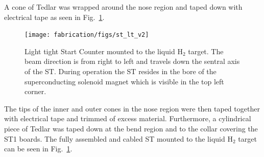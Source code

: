 A cone of Tedlar was wrapped around the nose region and taped down with electrical tape as seen in Fig.~\ref{fig:light_tight_st}. 
\begin{figure}[!htb]
	\centering
	\texttt{[image: fabrication/figs/st\_lt\_v2]}
	\caption{Light tight Start Counter mounted to the \gx{} liquid $\mathrm{H_{2}}$ target.  The beam direction is from right to left and travels down the sentral axis of the ST.  During operation the ST resides in the bore of the superconducting solenoid magnet which is visible in the top left corner.}
	\label{fig:light_tight_st}
\end{figure}
The tips of the inner and outer cones in the nose region were then taped together with electrical tape and trimmed of excess material. Furthermore, a cylindrical piece of Tedlar was taped down at the bend region and to the collar covering the ST1 boards.  The fully assembled and cabled ST mounted to the \gx{} liquid $\mathrm{H_{2}}$ target can be seen in Fig.~\ref{fig:light_tight_st}. 